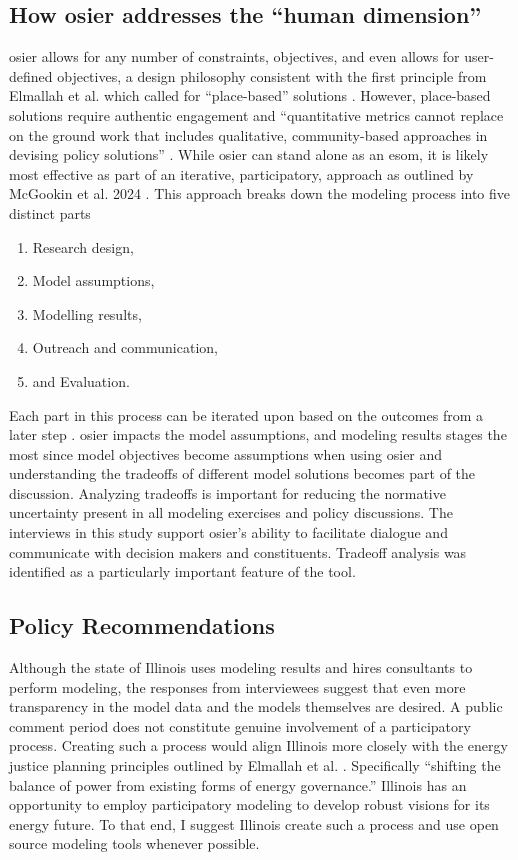 \subsection{How \ac{osier} addresses the ``human dimension''} 

\ac{osier} allows for any number of constraints, objectives, and even allows for
user-defined objectives, a design philosophy consistent with the first principle
from Elmallah et al. which called for ``place-based'' solutions
\cite{elmallah_frontlining_2022}. However, place-based solutions require
authentic engagement and ``quantitative metrics cannot replace on the ground
work that includes qualitative, community-based approaches in devising policy
solutions'' \cite{elmallah_frontlining_2022}. While \ac{osier} can stand alone
as an \ac{esom}, it is likely most effective as part of an iterative,
participatory, approach as outlined by McGookin et al. 2024
\cite{mcgookin_advancing_2024}. This approach breaks down the modeling process
into five distinct parts
\begin{enumerate}
    \item Research design,
    \item Model assumptions,
    \item Modelling results,
    \item Outreach and communication,
    \item and Evaluation.
\end{enumerate}
Each part in this process can be iterated upon based on the outcomes from a
later step \cite{mcgookin_advancing_2024}. \ac{osier} impacts the model
assumptions, and modeling results stages the most since model objectives become
assumptions when using \ac{osier} and understanding the tradeoffs of different
model solutions becomes part of the discussion. Analyzing tradeoffs is important
for reducing the normative uncertainty present in all modeling exercises and
policy discussions. The interviews in this study support \ac{osier}'s ability to
facilitate dialogue and communicate with decision makers and constituents.
Tradeoff analysis was identified as a particularly important feature of the
tool.

\subsection{Policy Recommendations}
Although the state of Illinois uses modeling results and hires consultants to
perform modeling, the responses from interviewees suggest that even more
transparency in the model data and the models themselves are desired. A public
comment period does not constitute genuine involvement of a participatory
process. Creating such a process would align Illinois more closely with the
energy justice planning principles outlined by Elmallah et al.
\cite{elmallah_frontlining_2022}. Specifically ``shifting the balance of power
from existing forms of energy governance.'' Illinois has an opportunity to
employ participatory modeling to develop robust visions for its energy future.
To that end, I suggest Illinois create such a process and use open source
modeling tools whenever possible.

